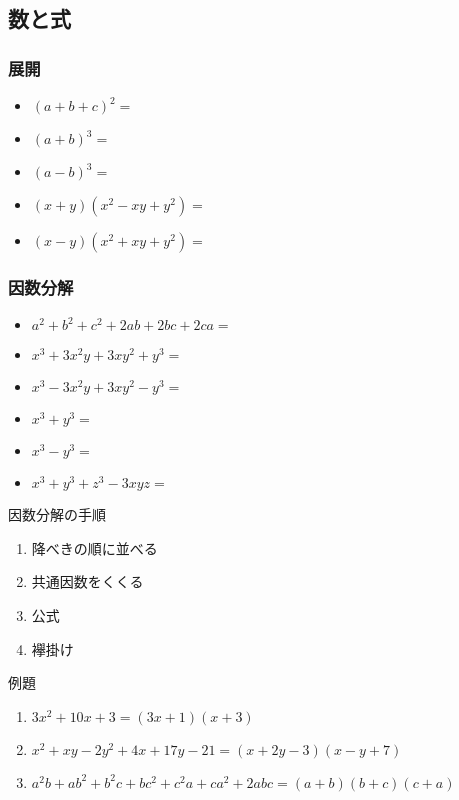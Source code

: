 \documentclass[10pt,dvipdfmx]{jsarticle}
\newcommand{\answer}[2]{{\color{orange}#2}}
\newcommand{\answer}[2]{\vspace{#1mm}}
\begin{document}
\subsection*{数と式}
\subsubsection*{展開}
\begin{Large}
  \begin{itemize}
    \item $(a+b+c)^2=$
    \item $(a+b)^3=$
    \item $(a-b)^3=$
    \item $(x+y)(x^2-xy+y^2)=$
    \item $(x-y)(x^2+xy+y^2)=$
  \end{itemize}
\end{Large}

\subsubsection*{因数分解}
\begin{Large}
  \begin{itemize}
    \item $a^2+b^2+c^2+2ab+2bc+2ca=$
    \item $x^3+3x^2y+3xy^2+y^3=$
    \item  $x^3-3x^2y+3xy^2-y^3=$
    \item $x^3+y^3=$
    \item $x^3-y^3=$
    \item $x^3+y^3+z^3-3xyz=$
  \end{itemize}
\end{Large}
\begin{itembox}[l]{因数分解の手順}
  \begin{Large}
    \begin{enumerate}
      \item \answer{0}{降べきの順に並べる}
      \item \answer{0}{共通因数をくくる}%
      \item \answer{0}{公式} %
      \item \answer{0}{襷掛け} %
    \end{enumerate}
  \end{Large}
\end{itembox}

\begin{itembox}[l]{例題}
  \begin{large}
    \begin{enumerate}
      \item $3x^2+10x+3=$\answer{0}{$(3x+1)(x+3)$}
      \item $x^2+xy-2y^2+4x+17y-21=$\answer{0}{$(x+2y-3)(x-y+7)$}
      \item $a^2b+ab^2+b^2c+bc^2+c^2a+ca^2+2abc=$\answer{0}{$(a+b)(b+c)(c+a)$}
    \end{enumerate}
  \end{large}
\end{itembox}
\end{document}
